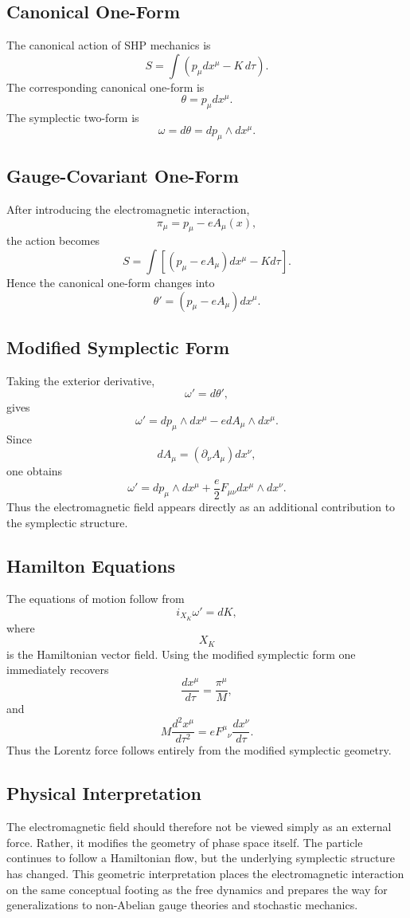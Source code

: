 \subsection{Canonical One-Form}
The canonical action of SHP mechanics is
\[S=\int\left(p_\mu dx^\mu-K\,d\tau\right).\]
The corresponding canonical one-form is
\[\boxed{\theta=p_\mu dx^\mu .}\]
The symplectic two-form is
\[\boxed{\omega=d\theta=dp_\mu\wedge dx^\mu .}\]
\subsection{Gauge-Covariant One-Form}
After introducing the electromagnetic interaction,
\[\pi_\mu=p_\mu-eA_\mu(x),\]
the action becomes
\[S=\int\left[(p_\mu-eA_\mu)dx^\mu-K d\tau\right].\]
Hence the canonical one-form changes into
\[\boxed{\theta'=(p_\mu-eA_\mu)dx^\mu .}\]
\subsection{Modified Symplectic Form}
Taking the exterior derivative,
\[\omega'=d\theta',\]
gives
\[\omega'=dp_\mu\wedge dx^\mu-e dA_\mu\wedge dx^\mu.\]
Since
\[dA_\mu=(\partial_\nu A_\mu)dx^\nu,\]
one obtains
\[\boxed{\omega'=dp_\mu\wedge dx^\mu+\frac{e}{2}F_{\mu\nu}dx^\mu\wedge dx^\nu .}\]
Thus the electromagnetic field appears directly as an additional
contribution to the symplectic structure.
\subsection{Hamilton Equations}
The equations of motion follow from
\[i_{X_K}\omega'=dK,\]
where
\[X_K\]
is the Hamiltonian vector field.
Using the modified symplectic form one immediately recovers
\[\frac{dx^\mu}{d\tau}=\frac{\pi^\mu}{M},\]
and
\[\boxed{M\frac{d^2x^\mu}{d\tau^2}=eF^\mu{}_\nu\frac{dx^\nu}{d\tau}.}\]
Thus the Lorentz force follows entirely from the modified symplectic
geometry.
\subsection{Physical Interpretation}
The electromagnetic field should therefore not be viewed simply as an
external force.
Rather, it modifies the geometry of phase space itself.
The particle continues to follow a Hamiltonian flow, but the underlying
symplectic structure has changed.
This geometric interpretation places the electromagnetic interaction on
the same conceptual footing as the free dynamics and prepares the way
for generalizations to non-Abelian gauge theories and stochastic
mechanics.
